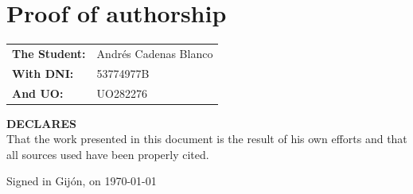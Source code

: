 \chapter{Proof of authorship}
\label{chap:proof_authority}
\begin{table}[h]
            \begin{tabular}{ll}
                \textbf{The Student:} & Andrés Cadenas Blanco \\ [0.5cm]
                \textbf{With DNI:} & 53774977B \\ [0.5cm]
                \textbf{And UO:} & UO282276
            \end{tabular}
\end{table}
\textbf{DECLARES}
\\
That the work presented in this document is the result of his 
own efforts and that all sources used have been properly cited.

Signed in Gijón, on \today
